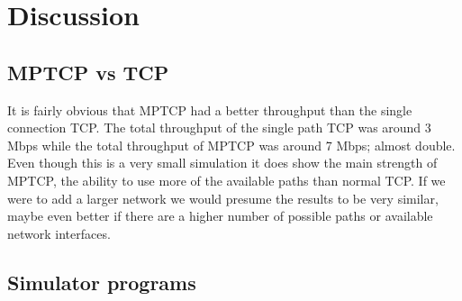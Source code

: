 \documentclass[11pt,twocolumn]{article}
\begin{document}

\section{Discussion}

\subsection{MPTCP vs TCP}
It is fairly obvious that MPTCP had a better throughput than the single connection TCP. The total throughput of the single path TCP was around 3 Mbps while the total throughput of MPTCP was around 7 Mbps; almost double. Even though this is a very small simulation it does show the main strength of MPTCP, the ability to use more of the available paths than normal TCP. If we were to add a larger network we would presume the results to be very similar, maybe even better if there are a higher number of possible paths or available network interfaces.


\subsection{Simulator programs}

\newpage
\end{document}
